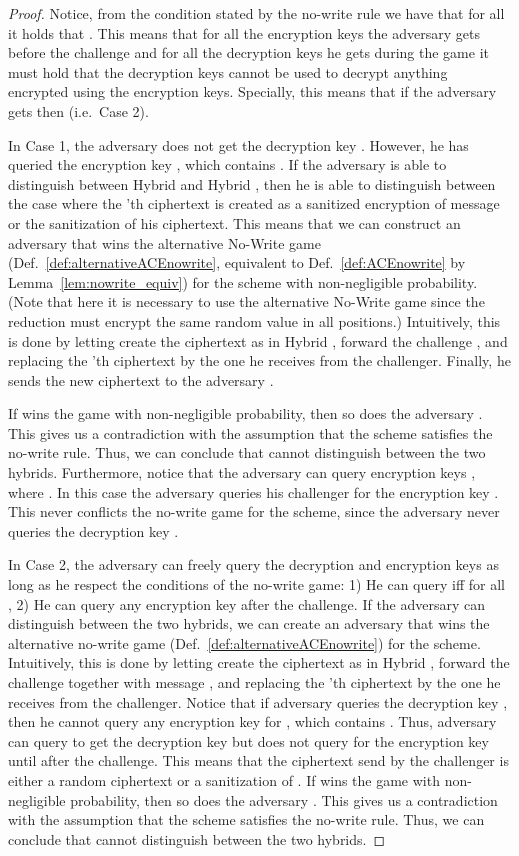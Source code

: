 \documentclass{llncs}
\begin{document}
\begin{proof}
Notice, from the condition stated by the no-write rule we have that for all  it holds that . This means that for all the encryption keys the adversary gets before the challenge and for all the decryption keys he gets during the game it must hold that the decryption keys cannot be used to decrypt anything encrypted using the encryption keys.
Specially, this means that if the adversary gets  then  (i.e.~Case 2).

In Case 1, the adversary does not get the decryption key . However, he has queried the encryption key , which contains .
If the adversary  is able to distinguish between Hybrid  and Hybrid , then he is able to distinguish between the case where the 'th \oACE ciphertext is created as a sanitized encryption of message  or the sanitization of his ciphertext. This means that we can construct an adversary  that wins the alternative No-Write game (Def.~\ref{def:alternativeACEnowrite}, equivalent to Def.~\ref{def:ACEnowrite} by Lemma~\ref{lem:nowrite_equiv}) for the \oACE scheme with non-negligible probability. (Note that here it is necessary to use the alternative No-Write game since the reduction must encrypt the same random value  in all positions.) Intuitively, this is done by letting  create the ciphertext  as in Hybrid , forward the challenge , and replacing the 'th \oACE ciphertext by the one he receives from the challenger. Finally, he sends the new ciphertext to the adversary . 


If  wins the game with non-negligible probability, then so does the adversary . This gives us a contradiction with the assumption that the \oACE scheme satisfies the no-write rule. Thus, we can conclude that  cannot distinguish between the two hybrids.
Furthermore, notice that the adversary  can query encryption keys , where . In this case the adversary   queries his challenger for the encryption key . This  never conflicts the no-write game for the \oACE scheme, since the adversary  never queries the decryption key . 

In Case 2, the adversary can freely query the decryption and encryption keys as long as he respect the conditions of the no-write game: 1) He can query  iff  for all , 2) He can query any encryption key after the challenge.
If the adversary  can distinguish between the two hybrids, we can create an adversary  that wins the alternative no-write game (Def.~\ref{def:alternativeACEnowrite}) for the \oACE scheme. 
Intuitively, this is done by letting  create the ciphertext  as in Hybrid , forward the challenge together with message , and replacing the 'th \oACE ciphertext by the one he receives from the challenger.
Notice that if adversary  queries the decryption key , then he cannot query any encryption key  for , which contains . 
Thus, adversary  can query to get the decryption key  but does not query for the encryption key  until after the challenge.
This means that the \oACE ciphertext  send by the challenger is either a random \oACE ciphertext or a sanitization of .
If  wins the game with non-negligible probability, then so does the adversary . This gives us a contradiction with the assumption that the \oACE scheme satisfies the no-write rule. Thus, we can conclude that  cannot distinguish between the two hybrids.


\end{proof}
\end{document}
